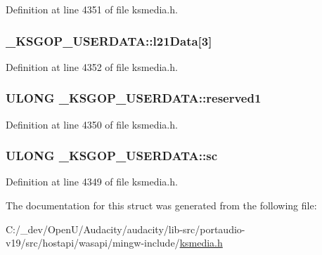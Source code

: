 Definition at line 4351 of file ksmedia.\+h.

\subsubsection[{\texorpdfstring{l21\+Data}{l21Data}}]{ \+\_\+\+K\+S\+G\+O\+P\+\_\+\+U\+S\+E\+R\+D\+A\+T\+A\+::l21\+Data\mbox{[}3\mbox{]}}\hypertarget{struct___k_s_g_o_p___u_s_e_r_d_a_t_a_acafeb74d6925ec55c26dca83f4e94e6d}{}\label{struct___k_s_g_o_p___u_s_e_r_d_a_t_a_acafeb74d6925ec55c26dca83f4e94e6d}


Definition at line 4352 of file ksmedia.\+h.

\subsubsection[{\texorpdfstring{reserved1}{reserved1}}]{\setlength{\rightskip}{0pt plus 5cm}U\+L\+O\+NG \+\_\+\+K\+S\+G\+O\+P\+\_\+\+U\+S\+E\+R\+D\+A\+T\+A\+::reserved1}\hypertarget{struct___k_s_g_o_p___u_s_e_r_d_a_t_a_ad53a643d4f9f2cd8993939e0b3796582}{}\label{struct___k_s_g_o_p___u_s_e_r_d_a_t_a_ad53a643d4f9f2cd8993939e0b3796582}


Definition at line 4350 of file ksmedia.\+h.

\subsubsection[{\texorpdfstring{sc}{sc}}]{\setlength{\rightskip}{0pt plus 5cm}U\+L\+O\+NG \+\_\+\+K\+S\+G\+O\+P\+\_\+\+U\+S\+E\+R\+D\+A\+T\+A\+::sc}\hypertarget{struct___k_s_g_o_p___u_s_e_r_d_a_t_a_afab4d89a4d0fedc49bedd2d4f8b259e8}{}\label{struct___k_s_g_o_p___u_s_e_r_d_a_t_a_afab4d89a4d0fedc49bedd2d4f8b259e8}


Definition at line 4349 of file ksmedia.\+h.



The documentation for this struct was generated from the following file\+:\begin{DoxyCompactItemize}
\item 
C\+:/\+\_\+dev/\+Open\+U/\+Audacity/audacity/lib-\/src/portaudio-\/v19/src/hostapi/wasapi/mingw-\/include/\hyperlink{ksmedia_8h}{ksmedia.\+h}\end{DoxyCompactItemize}
